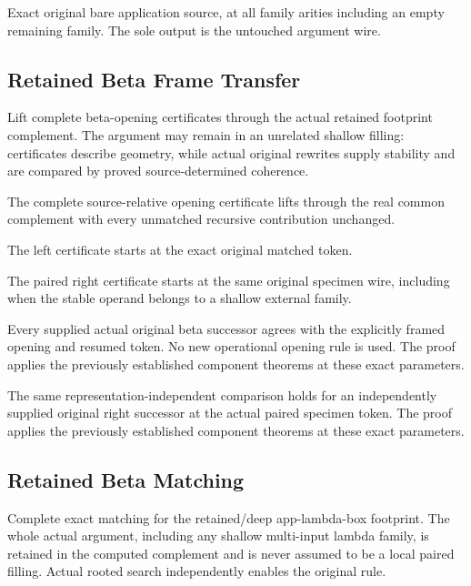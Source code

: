 Exact original bare application source, at all family arities including
an empty remaining family. The sole output is the untouched argument wire.
\par{}

\subsection{Retained Beta Frame Transfer}
Lift complete beta-opening certificates through the actual retained
footprint complement. The argument may remain in an unrelated shallow
filling: certificates describe geometry, while actual original rewrites
supply stability and are compared by proved source-determined coherence.

The complete source-relative opening certificate lifts through the real
common complement with every unmatched recursive contribution unchanged.
\par{}

The left certificate starts at the exact original matched token.
\par{}

The paired right certificate starts at the same original specimen wire,
including when the stable operand belongs to a shallow external family.
\par{}

Every supplied actual original beta successor agrees with the explicitly
framed opening and resumed token. No new operational opening rule is used.
The proof applies the previously established component theorems at these exact parameters.
\par{}

The same representation-independent comparison holds for an independently
supplied original right successor at the actual paired specimen token.
The proof applies the previously established component theorems at these exact parameters.
\par{}

\subsection{Retained Beta Matching}
Complete exact matching for the retained/deep app-lambda-box footprint.
The whole actual argument, including any shallow multi-input lambda family,
is retained in the computed complement and is never assumed to be a local
paired filling. Actual rooted search independently enables the original rule.

